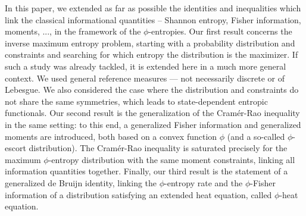 \documentclass[entropy,article,submit,moreauthors,pdftex]{Definitions/mdpi}
\begin{document}
In this  paper, we extended as  far as possible the  identities and inequalities
which link  the classical  informational quantities  -- Shannon  entropy, Fisher
information, moments, ...,  in the framework of the  $\phi$-entropies. Our first
result concerns the inverse maximum entropy problem, starting with a probability
distribution and constraints and searching for which entropy the distribution is
the maximizer.  If  such a study was  already tackled, it is extended  here in a
much  more  general  context.   We  used  general  reference  measures  ---  not
necessarily discrete  or of  Lebesgue.  We  also considered  the case  where the
distribution and  constraints do not share  the same symmetries, which  leads to
state-dependent entropic  functionals.  Our second result  is the generalization
of the Cram\'er-Rao  inequality in the same setting: to  this end, a generalized
Fisher  information and  generalized moments  are  introduced, both  based on  a
convex  function  $\phi$  (and  a so-called  $\phi$-escort  distribution).   The
Cram\'er-Rao inequality  is saturated  precisely for the  maximum $\phi$-entropy
distribution  with   the  same  moment  constraints,   linking  all  information
quantities  together.   Finally,  our  third   result  is  the  statement  of  a
generalized  de  Bruijn  identity,  linking  the  $\phi$-entropy  rate  and  the
$\phi$-Fisher  information  of  a   distribution  satisfying  an  extended  heat
equation, called $\phi$-heat equation.
\end{document}
